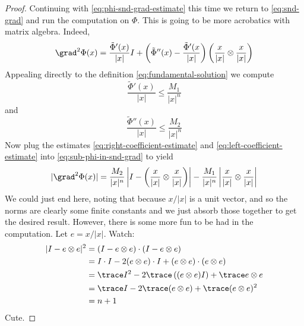 \documentclass{bkcnotes}
\begin{document}
\begin{proof}
  Continuing with \eqref{eq:phi-snd-grad-estimate} this time we return
  to \eqref{eq:snd-grad} and run the computation on $\Phi$. This is
  going to be more acrobatics with matrix algebra. Indeed,
  \begin{equation}
    \label{eq:sub-phi-in-snd-grad}
    \grad^2\Phi(x) =
    \frac{\tilde{\Phi}'(x)}{|x|}I
    + \left(\tilde{\Phi}''(x) - 
      \frac{\tilde{\Phi}'(x}{|x|}\right)\left(\frac{x}{|x|} \otimes 
      \frac{x}{|x|}\right)
  \end{equation}
  Appealing directly to the definition \eqref{eq:fundamental-solution}
  we compute
  \begin{equation}
    \label{eq:right-coefficient-estimate}
    \frac{\tilde{\Phi}'(x)}{|x|} \leq \frac{M_1}{|x|^n}    
  \end{equation}
  and
  \begin{equation}
    \label{eq:left-coefficient-estimate}
    \frac{\widetilde{\Phi}''(x)}{|x|} \leq \frac{M_2}{|x|^n}
  \end{equation}
  Now plug the estimates \eqref{eq:right-coefficient-estimate} and
  \eqref{eq:left-coefficient-estimate} into
  \eqref{eq:sub-phi-in-snd-grad} to yield
  \begin{equation}
    \label{eq:nsd-grad-norm-estimate}
    |\grad^2\Phi(x)| =
    \frac{M_2}{|x|^n}\left| I - \left(\frac{x}{|x|}\otimes 
        \frac{x}{|x|}\right)\right| -
    \frac{M_1}{|x|^n}\left|\frac{x}{|x|}\otimes \frac{x}{|x|} \right|
  \end{equation}
  We could just end here, noting that because $x/|x|$ is a unit
  vector, and so the norms are clearly some finite constants and we
  just absorb those together to get the desired result. However, there
  is some more fun to be had in the computation. Let $e =
  x/|x|$. Watch:
  \begin{equation}
    \label{eq:1}
    \begin{aligned}
      |I - e \otimes e|^2 &= (I - e \otimes e)\cdot (I - e \otimes e) \\
      &= I \cdot I - 2(e \otimes e)\cdot I + (e \otimes e)\cdot(e\otimes e) \\
      &= \trace I^2 - 2\trace\left((e \otimes e) I\right) + \trace
      e\otimes e \\
      &= \trace I - 2\trace(e \otimes e) + \trace (e\otimes e)^2 \\
      &= n+1
    \end{aligned}
  \end{equation}
  Cute.
\end{proof}
\end{document}

